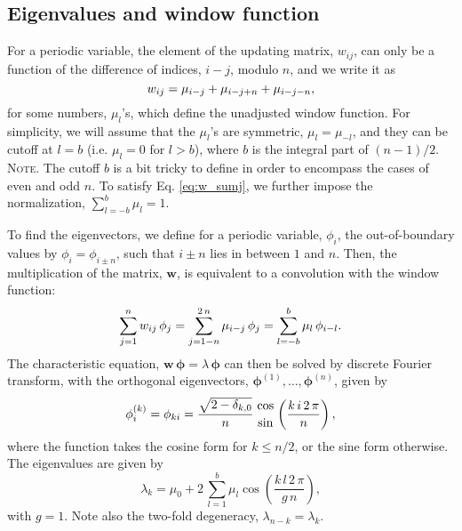 \documentclass[reprint, superscriptaddress, floatfix]{revtex4-1}
\newcommand{\note}[1]{{\color{DarkGreen}\footnotesize \textsc{Note.} #1}}
\begin{document}
\subsection{\label{sec:wband_eig}
Eigenvalues and window function}



For a periodic variable\cite{dama2014},
the element of the updating matrix, $w_{ij}$,
can only be a function of the difference of indices, $i-j$, modulo $n$,
and we write it as
%
\begin{equation}
  w_{ij}
  =
  \mu_{i-j}
  +
  \mu_{i-j+n}
  +
  \mu_{i-j-n}
  ,
  \notag
\end{equation}
%
for some numbers, $\mu_l$'s, which
define the unadjusted window function.
%
For simplicity, we will assume that
the $\mu_l$'s are symmetric, $\mu_l = \mu_{-l}$,
and they can be cutoff at $l = b$
(i.e. $\mu_l = 0$ for $l > b$),
where $b$ is the integral part of $(n-1)/2$.
%
\note{The cutoff $b$ is a bit tricky to define
in order to encompass the cases of even and odd $n$.}%
%
To satisfy Eq. \eqref{eq:w_sumj}, we further impose
the normalization, $\sum_{l=-b}^b \mu_l = 1$.
%



To find the eigenvectors,
we define for a periodic variable, $\phi_i$,
the out-of-boundary values by
$\phi_i = \phi_{i \pm n}$,
%
such that $i \pm n$ lies in between $1$ and $n$.
%
Then, the multiplication of the matrix, $\mathbf w$,
is equivalent to a convolution with the window function:
%
\begin{equation}
  \sum_{ j = 1 }^n
    w_{ij} \, \phi_j
  =
  \sum_{ j = 1 - n }^{ 2 \, n }
    \mu_{i - j} \, \phi_j
  =
  \sum_{ l = -b }^{ b }
    \mu_l \, \phi_{ i - l}
  .
  \notag
\end{equation}
%
The characteristic equation,
$\mathbf w \, \pmb\phi = \lambda \, \pmb\phi$
can then be solved by discrete Fourier transform,
with the orthogonal eigenvectors,
$\pmb\phi^{(1)}, \dots, \pmb\phi^{(n)}$,
given by
%
\begin{equation}
  \phi^{(k)}_i
  =
  \phi_{ki}
  =
  \frac{ \sqrt{ 2 - \delta_{k,0} } } { n }
  \,
  {\cos \atop \sin}
  \left(
    \frac{ k \, i \, 2 \, \pi }
         {      n             }
  \right)
  ,
  \notag
\end{equation}
%
where the function takes the cosine form for $k \le n/2$,
or the sine form otherwise.
%
The eigenvalues are given by
\begin{equation}
  \lambda_k
  =
  \mu_0
  +
  2 \,
  \sum_{ l = 1 }^b
  \mu_l
  \cos\left(
  \frac{ k \, l \, 2 \, \pi }
       {      g \, n        }
  \right)
  ,
  \label{eq:wband_eigenvalue}
\end{equation}
%
with $g = 1$.
Note also the two-fold degeneracy,
  $\lambda_{n - k} = \lambda_k$.
\end{document}
